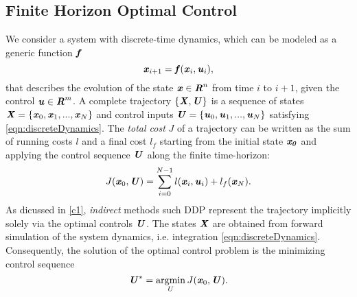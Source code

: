 \subsection{Finite Horizon Optimal Control}
We consider a system with discrete-time dynamics, which can be modeled as a generic function $\bm{\mathit{f}}$
\begin{equation}\label{eqn:discreteDynamics}
\bm{\mathit{x}}_{i+1}=\bm{\mathit{f}}(\bm{\mathit{x}}_i,\bm{\mathit{u}}_i), 
\end{equation}
that describes the evolution of the state $\bm{\mathit{x}}\in \bm{\mathit{R}}^n$ from time $i$ to $i+1$, given the control $\bm{\mathit{u}}\in \bm{\mathit{R}}^m$. A complete trajectory $\{\bm{\mathit{X}}, \bm{\mathit{U}}\}$ is a sequence of states $\bm{\mathit{X}}=\{\bm{\mathit{x}}_0, \bm{\mathit{x}}_1, ..., \bm{\mathit{x}}_N\}$ and control inputs $\bm{\mathit{U}}=\{\bm{\mathit{u}}_0, \bm{\mathit{u}}_1, ..., \bm{\mathit{u}}_N\}$ satisfying \cref{eqn:discreteDynamics}.
The \textit{total cost} $J$ of a trajectory can be written as the sum of running costs $l$ and a final cost $l_f$ starting from the initial state $\bm{\mathit{x_0}}$ and applying the control sequence $\bm{\mathit{U}}$ along the finite time-horizon:     
\begin{equation*}\label{eqn:totalCost}
J(\bm{\mathit{x}}_0, \bm{\mathit{U}})=\sum_{i=0}^{N-1}l(\bm{\mathit{x}}_i,\bm{\mathit{u}}_i)+l_f(\bm{\mathit{x}}_N).
\end{equation*}
As dicussed in \cref{c1}, \textit{indirect} methods such \gls{DDP} represent the trajectory implicitly solely via the optimal controls $\bm{\mathit{U}}$. The states $\bm{\mathit{X}}$ are obtained from forward simulation of the system dynamics, i.e. integration \cref{eqn:discreteDynamics}. Consequently, the solution of the optimal control problem is the minimizing control sequence 
\begin{equation*}\label{eqn:minControl}
\bm{\mathit{U}}^*=\operatorname*{argmin}_U J(\bm{\mathit{x}}_0, \bm{\mathit{U}}). 
\end{equation*}

